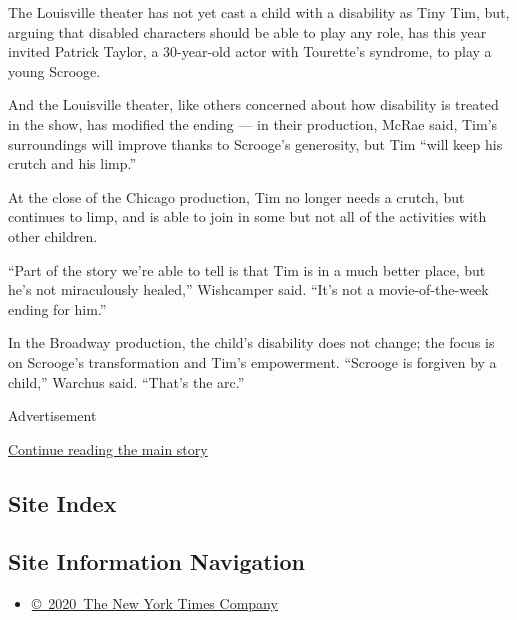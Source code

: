 The Louisville theater has not yet cast a child with a disability as
Tiny Tim, but, arguing that disabled characters should be able to play
any role, has this year invited Patrick Taylor, a 30-year-old actor with
Tourette's syndrome, to play a young Scrooge.

And the Louisville theater, like others concerned about how disability
is treated in the show, has modified the ending --- in their production,
McRae said, Tim's surroundings will improve thanks to Scrooge's
generosity, but Tim ``will keep his crutch and his limp.''

At the close of the Chicago production, Tim no longer needs a crutch,
but continues to limp, and is able to join in some but not all of the
activities with other children.

``Part of the story we're able to tell is that Tim is in a much better
place, but he's not miraculously healed,'' Wishcamper said. ``It's not a
movie-of-the-week ending for him.''

In the Broadway production, the child's disability does not change; the
focus is on Scrooge's transformation and Tim's empowerment. ``Scrooge is
forgiven by a child,'' Warchus said. ``That's the arc.''

Advertisement

\protect\hyperlink{after-bottom}{Continue reading the main story}

\hypertarget{site-index}{%
\subsection{Site Index}\label{site-index}}

\hypertarget{site-information-navigation}{%
\subsection{Site Information
Navigation}\label{site-information-navigation}}

\begin{itemize}
\tightlist
\item
  \href{https://help.nytimes3xbfgragh.onion/hc/en-us/articles/115014792127-Copyright-notice}{©~2020~The
  New York Times Company}
\end{itemize}

